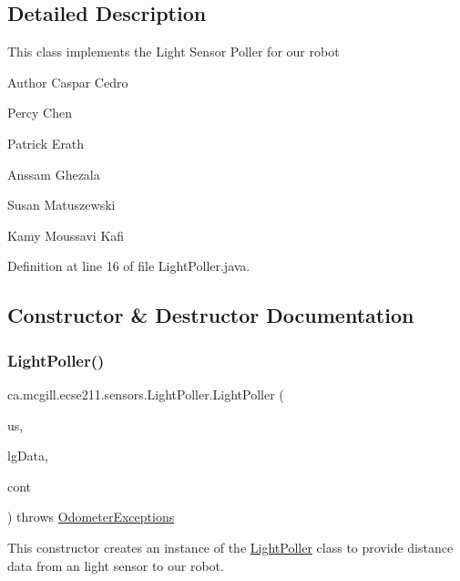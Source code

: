 \subsection{Detailed Description}
This class implements the Light Sensor Poller for our robot

\begin{DoxyAuthor}{Author}
Caspar Cedro 

Percy Chen 

Patrick Erath 

Anssam Ghezala 

Susan Matuszewski 

Kamy Moussavi Kafi 
\end{DoxyAuthor}


Definition at line 16 of file Light\+Poller.\+java.



\subsection{Constructor \& Destructor Documentation}
\mbox{\label{classca_1_1mcgill_1_1ecse211_1_1sensors_1_1_light_poller_aa284d0f6d7e032d3610a7ad428f16132}} 
\subsubsection{\texorpdfstring{Light\+Poller()}{LightPoller()}}
{\footnotesize\ttfamily ca.\+mcgill.\+ecse211.\+sensors.\+Light\+Poller.\+Light\+Poller (\begin{DoxyParamCaption}\item[{Sample\+Provider}]{us,  }\item[{float \mbox{[}$\,$\mbox{]}}]{lg\+Data,  }\item[{\hyperlink{classca_1_1mcgill_1_1ecse211_1_1sensors_1_1_sensor_data}{Sensor\+Data}}]{cont }\end{DoxyParamCaption}) throws \hyperlink{classca_1_1mcgill_1_1ecse211_1_1odometer_1_1_odometer_exceptions}{Odometer\+Exceptions}}

This constructor creates an instance of the \hyperlink{classca_1_1mcgill_1_1ecse211_1_1sensors_1_1_light_poller}{Light\+Poller} class to provide distance data from an light sensor to our robot.


